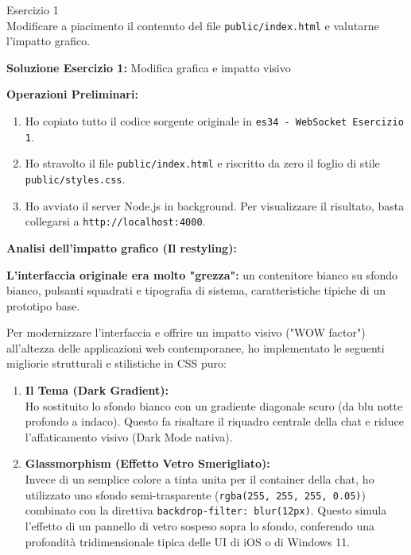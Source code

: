 \documentclass[11pt]{article}
\begin{document}
\begin{tcolorbox}[colback=blue!5!white,colframe=blue!75!black,title=\textbf{DOMANDA}, breakable]
Esercizio 1\\
Modificare a piacimento il contenuto del file \texttt{public/index.html} e valutarne l'impatto grafico.
\end{tcolorbox}

\begin{tcolorbox}[colback=green!5!white,colframe=green!75!black,title=\textbf{RISPOSTA}, breakable]
\textbf{Soluzione Esercizio 1:} Modifica grafica e impatto visivo

\textbf{Operazioni Preliminari:}
\begin{enumerate}
    \item Ho copiato tutto il codice sorgente originale in \texttt{es34 - WebSocket Esercizio 1}.
    \item Ho stravolto il file \texttt{public/index.html} e riscritto da zero il foglio di stile \texttt{public/styles.css}.
    \item Ho avviato il server Node.js in background. Per visualizzare il risultato, basta collegarsi a \texttt{http://localhost:4000}.
\end{enumerate}

\textbf{Analisi dell'impatto grafico (Il restyling):}

\textbf{L'interfaccia originale era molto "grezza":} un contenitore bianco su sfondo bianco, pulsanti squadrati e tipografia di sistema, caratteristiche tipiche di un prototipo base. 

Per modernizzare l'interfaccia e offrire un impatto visivo ("WOW factor") all'altezza delle applicazioni web contemporanee, ho implementato le seguenti migliorie strutturali e stilistiche in CSS puro:

\begin{enumerate}
    \item \textbf{Il Tema (Dark Gradient):}\\
    Ho sostituito lo sfondo bianco con un gradiente diagonale scuro (da blu notte profondo a indaco). Questo fa risaltare il riquadro centrale della chat e riduce l'affaticamento visivo (Dark Mode nativa).

    \item \textbf{Glassmorphism (Effetto Vetro Smerigliato):}\\
    Invece di un semplice colore a tinta unita per il container della chat, ho utilizzato uno sfondo semi-trasparente (\texttt{rgba(255, 255, 255, 0.05)}) combinato con la direttiva \texttt{backdrop-filter: blur(12px)}. Questo simula l'effetto di un pannello di vetro sospeso sopra lo sfondo, conferendo una profondità tridimensionale tipica delle UI di iOS o di Windows 11.


\end{enumerate}
\end{tcolorbox}
\end{document}
